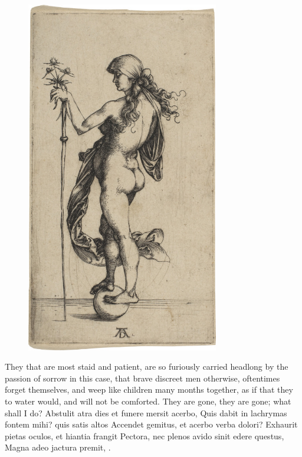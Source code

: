 {\cleartoleftpage{}
\begin{figure}[p]
  \begingroup
  \centering
  \includegraphics[keepaspectratio,width=0.75\textwidth]{figures/fortuna-small.jpg}
  \label{fig:fortuna}
\end{figure}

\clearpage{}
They that are most staid and patient, are so furiously carried headlong
by the passion of sorrow in this case, that brave discreet men
otherwise, oftentimes forget themselves, and weep like children many
months together, as if that they to water would, and will not be
comforted. They are gone, they are gone; what shall I do?
Abstulit atra dies et funere mersit acerbo,
Quis dabit in lachrymas fontem mihi? quis satis altos
Accendet gemitus, et acerbo verba dolori?
Exhaurit pietas oculos, et hiantia frangit
Pectora, nec plenos avido sinit edere questus,
Magna adeo jactura premit, \etc{}.

}
